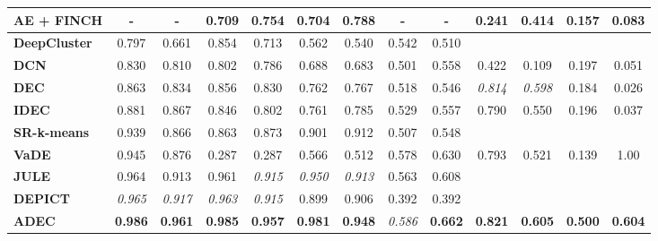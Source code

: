 \documentclass{article}
\begin{document}
\begin{table}
\begin{center}
\begin{small}
\begin{tabular}{|p{2.45cm}|c|c|c|c|c|c|c|c|c|c|c|c|}
    \textbf{AE + FINCH} & {-} & {-} & 0.709 & 0.754 & 0.704 & 0.788 & {-} & {-} & 0.241 & 0.414 & 0.157 & 0.083 \\ \hline 
    \textbf{DeepCluster} & 0.797 & 0.661 & 0.854 & 0.713 & 0.562 & 0.540 & 0.542  & 0.510 &  &  &  &  \\ \hline
    \textbf{DCN} & 0.830 & 0.810 & 0.802 & 0.786 & 0.688 & 0.683  & 0.501 & 0.558 & 0.422 & 0.109 & 0.197 & 0.051 \\ \hline 
    \textbf{DEC} & 0.863 & 0.834 & 0.856 & 0.830 & 0.762 & 0.767 & 0.518 & 0.546 &  \textit{0.814} & \textit{0.598} & 0.184 & 0.026 \\ \hline
    \textbf{IDEC} & 0.881 & 0.867 & 0.846 & 0.802 & 0.761 & 0.785 & 0.529 & 0.557 & 0.790 & 0.550 & 0.196 & 0.037 \\ \hline
    \textbf{SR-k-means} & 0.939 & 0.866 & 0.863 & 0.873 & 0.901 & 0.912 & 0.507 & 0.548 &  &  &  &  \\ \hline
    \textbf{VaDE} & 0.945 & 0.876 & 0.287 & 0.287 & 0.566 & 0.512 & 0.578 & 0.630 & 0.793 & 0.521 & 0.139 & 1.00 \\ \hline
    \textbf{JULE} & 0.964 & 0.913 & 0.961 & \textit{0.915} & \textit{0.950} & \textit{0.913} & 0.563 & 0.608 &  &  &  &   \\ \hline
    \textbf{DEPICT} & \textit{0.965} & \textit{0.917} & \textit{0.963} & \textit{0.915} & 0.899 & 0.906 &  0.392 & 0.392 &  &  &  &  \\ \hline
    \textbf{ADEC} & \textbf{0.986} & \textbf{0.961} & \textbf{0.985} & \textbf{0.957} & \textbf{0.981} & \textbf{0.948} & \textit{0.586} & \textbf{0.662} & \textbf{0.821 } & \textbf{0.605 } &  \textbf{0.500 } & \textbf{0.604 } \\ \hline 
  \end{tabular}
  \label{table:ACC_NMI_comparison}
  \end{small}
  \end{center}
  \vskip -0.1in
\end{table}
\end{document}

